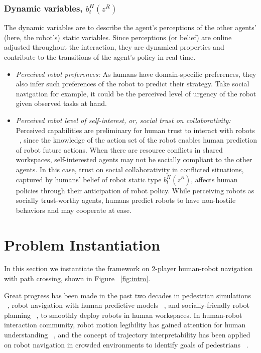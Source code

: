 \documentclass[letterpaper, 10 pt, conference]{ieeeconf}  %
\begin{document}
\subsubsection{Dynamic variables, $b^H_t(z^{R})$}%
The dynamic variables are to describe the agent's perceptions of the other 
agents' (here, the robot's) static variables. Since perceptions (or belief) are 
online adjusted throughout the interaction, they are dynamical properties and 
contribute to the transitions of the agent's policy in real-time.
\begin{itemize}
  \item \textit{Perceived robot preferences:} As humans have domain-specific 
    preferences, they also infer such preferences of the robot to predict 
    their strategy. Take social navigation for example, it could be the 
    perceived level of urgency of the robot given observed tasks at hand.   
  \item \textit{Perceived robot level of self-interest, or, social trust on collaborativity:}
  Perceived capabilities are preliminary for human trust to interact with robots ~\cite{yang2017evaluating}, since the knowledge of the action set of the robot enables 
human prediction of robot future actions. When there are resource conflicts in shared workspaces, self-interested agents may not be socially compliant to the other agents. 
In this case, trust on social collaborativity in conflicted situations, captured by humans' belief of robot static type $b^H_t(z^R)$, affects human policies through their anticipation of robot policy. While perceiving robots as socially trust-worthy agents, humans predict robots to have non-hostile behaviors and may cooperate at ease.   
\end{itemize}



\section{Problem Instantiation}
In this section we instantiate the framework on 2-player human-robot navigation with path 
crossing, shown in Figure ~\ref{fig:intro}.


Great progress has been made in the past two decades in pedestrian simulations ~\cite{karamouzas2009predictive,zanlungo2011social}, robot navigation with human predictive models ~\cite{trautman2010unfreezing,kuderer2012feature}, and socially-friendly robot planning ~\cite{mavrogiannis2016decentralized,chen2017socially}, to smoothly deploy robots in human workspaces. In human-robot interaction community, robot motion legibility has gained attention for human understanding ~\cite{dragan2013legibility}, and the concept of trajectory interpretability has been applied on robot navigation in crowded environments to identify goals of pedestrians ~\cite{bai2015intention,unhelkar2015human}. 
\end{document}

